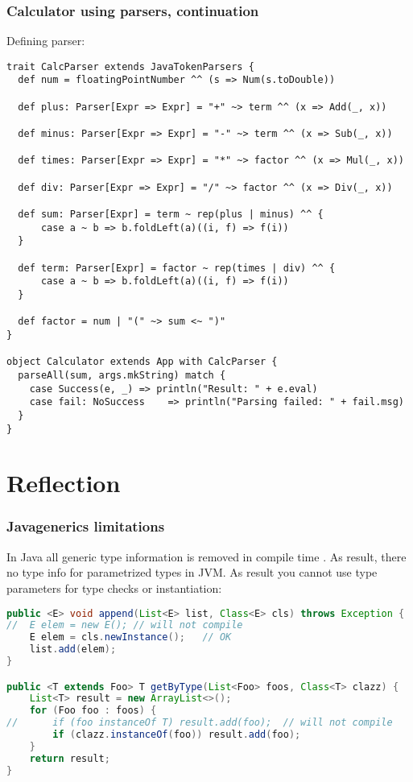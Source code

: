 \documentclass{beamer}
\begin{document}
\begin{frame}[fragile]
\frametitle{Calculator using parsers, continuation}
Defining parser:
\begin{lstlisting}[name=calc]
trait CalcParser extends JavaTokenParsers {
  def num = floatingPointNumber ^^ (s => Num(s.toDouble))

  def plus: Parser[Expr => Expr] = "+" ~> term ^^ (x => Add(_, x))

  def minus: Parser[Expr => Expr] = "-" ~> term ^^ (x => Sub(_, x))

  def times: Parser[Expr => Expr] = "*" ~> factor ^^ (x => Mul(_, x))

  def div: Parser[Expr => Expr] = "/" ~> factor ^^ (x => Div(_, x))

  def sum: Parser[Expr] = term ~ rep(plus | minus) ^^ {
      case a ~ b => b.foldLeft(a)((i, f) => f(i))
  }

  def term: Parser[Expr] = factor ~ rep(times | div) ^^ {
      case a ~ b => b.foldLeft(a)((i, f) => f(i))
  }

  def factor = num | "(" ~> sum <~ ")"
}

object Calculator extends App with CalcParser {
  parseAll(sum, args.mkString) match {
    case Success(e, _) => println("Result: " + e.eval)
    case fail: NoSuccess    => println("Parsing failed: " + fail.msg)
  }
}
\end{lstlisting}
\end{frame}

\section{Reflection}

\begin{frame}[fragile]
\frametitle{Java\texttrademark generics limitations}

In Java all generic type information is removed in compile time \cite{erasure}.  As result, there no type info for
parametrized types in JVM.  As result you cannot use type parameters for type checks or instantiation:

\begin{lstlisting}[language=Java]
public <E> void append(List<E> list, Class<E> cls) throws Exception {
//  E elem = new E(); // will not compile
    E elem = cls.newInstance();   // OK
    list.add(elem);
}

public <T extends Foo> T getByType(List<Foo> foos, Class<T> clazz) {
    List<T> result = new ArrayList<>();
    for (Foo foo : foos) {
//      if (foo instanceOf T) result.add(foo);  // will not compile
        if (clazz.instanceOf(foo)) result.add(foo);
    }
    return result;
}
\end{lstlisting}
\end{frame}
\end{document}
